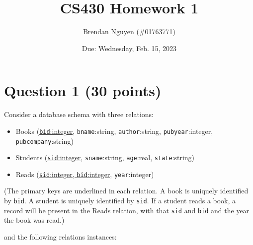 \documentclass[letterpaper, 11pt]{article}
\title{CS430 Homework 1}
\author{Brendan Nguyen (\#01763771)}
\date{Due: Wednesday, Feb. 15, 2023}
\begin{document}
\maketitle

\section*{Question 1 (30 points)}

Consider a database schema with three relations:
\begin{itemize}
    \item Books (\underline{\texttt{bid}:integer}, \texttt{bname}:string, \texttt{author}:string, \texttt{pubyear}:integer, \texttt{pubcompany}:string)
    \item Students (\underline{\texttt{sid}:integer}, \texttt{sname}:string, \texttt{age}:real, \texttt{state}:string)
    \item Reads (\underline{\texttt{sid}:integer, \texttt{bid}:integer}, \texttt{year}:integer)
\end{itemize}

(The primary keys are underlined in each relation. A book is uniquely identified by \texttt{bid}. A student is uniquely identified by \texttt{sid}. If a student reads a book, a record will be present in the Reads relation, with that \texttt{sid} and \texttt{bid} and the year the book was read.)

and the following relations instances:
\end{document}
